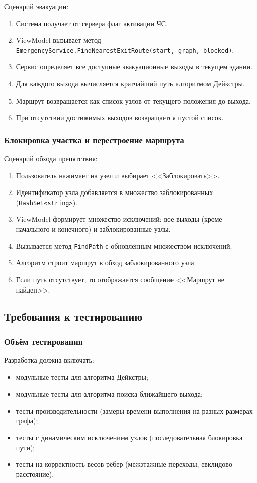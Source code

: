 Сценарий эвакуации:
\begin{enumerate}
\item Система получает от сервера флаг активации ЧС.
\item ViewModel вызывает метод \texttt{EmergencyService.FindNearestExitRoute(start, graph, blocked)}.
\item Сервис определяет все доступные эвакуационные выходы в текущем здании.
\item Для каждого выхода вычисляется кратчайший путь алгоритмом Дейкстры.
\item Маршрут возвращается как список узлов от текущего положения до выхода.
\item При отсутствии достижимых выходов возвращается пустой список.
\end{enumerate}

\subsubsection{Блокировка участка и перестроение маршрута}

Сценарий обхода препятствия:
\begin{enumerate}
\item Пользователь нажимает на узел и выбирает <<Заблокировать>>.
\item Идентификатор узла добавляется в множество заблокированных (\texttt{HashSet<string>}).
\item ViewModel формирует множество исключений: все выходы (кроме начального и конечного) и заблокированные узлы.
\item Вызывается метод \texttt{FindPath} с обновлённым множеством исключений.
\item Алгоритм строит маршрут в обход заблокированного узла.
\item Если путь отсутствует, то отображается сообщение <<Маршрут не найден>>.
\end{enumerate}

\subsection{Требования к тестированию}

\subsubsection{Объём тестирования}

Разработка должна включать:
\begin{itemize}
\item модульные тесты для алгоритма Дейкстры;
\item модульные тесты для алгоритма поиска ближайшего выхода;
\item тесты производительности (замеры времени выполнения на разных размерах графа);
\item тесты с динамическим исключением узлов (последовательная блокировка пути);
\item тесты на корректность весов рёбер (межэтажные переходы, евклидово расстояние).
\end{itemize}

